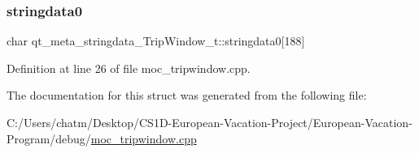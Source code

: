 \mbox{\label{structqt__meta__stringdata___trip_window__t_aa1be2cd8cbd427f3d07157097fb49920}} 
\subsubsection{\texorpdfstring{stringdata0}{stringdata0}}
{\footnotesize\ttfamily char qt\+\_\+meta\+\_\+stringdata\+\_\+\+Trip\+Window\+\_\+t\+::stringdata0\mbox{[}188\mbox{]}}



Definition at line 26 of file moc\+\_\+tripwindow.\+cpp.



The documentation for this struct was generated from the following file\+:\begin{DoxyCompactItemize}
\item 
C\+:/\+Users/chatm/\+Desktop/\+C\+S1\+D-\/\+European-\/\+Vacation-\/\+Project/\+European-\/\+Vacation-\/\+Program/debug/\mbox{\hyperlink{moc__tripwindow_8cpp}{moc\+\_\+tripwindow.\+cpp}}\end{DoxyCompactItemize}
